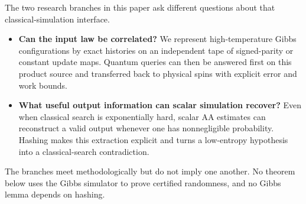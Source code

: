 \documentclass[11pt]{article}
\theoremstyle{definition}\newtheorem{definition}[theorem]{Definition}
\theoremstyle{remark}\newtheorem{remark}[theorem]{Remark}
\begin{document}
The two research branches in this paper ask different questions about that classical-simulation interface.
\begin{itemize}
\item \textbf{Can the input law be correlated?} We represent high-temperature Gibbs configurations by exact histories on an independent tape of signed-parity or constant update maps. Quantum queries can then be answered first on this product source and transferred back to physical spins with explicit error and work bounds.
\item \textbf{What useful output information can scalar simulation recover?} Even when classical search is exponentially hard, scalar AA estimates can reconstruct a valid output whenever one has nonnegligible probability. Hashing makes this extraction explicit and turns a low-entropy hypothesis into a classical-search contradiction.
\end{itemize}
The branches meet methodologically but do not imply one another. No theorem below uses the Gibbs simulator to prove certified randomness, and no Gibbs lemma depends on hashing.

\begin{center}
\end{center}
\end{document}
